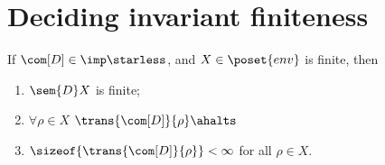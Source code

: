 \section{Deciding invariant finiteness}\label{sec:finiteness}

\begin{lemma}\label{le:finiteness}
  If \(\com[D]\in\imp\starless\), and \(X \in \poset{env}\) is
  finite, then
  \begin{enumerate}[label=(\roman*).]
  \item \(\sem{D}X\) is finite;
  \item \(\forall \rho \in X\) \(\trans{\com[D]}{\rho}\ahalts\)
  \item \(\sizeof{\trans{\com[D]}{\rho}} < \infty\) for all
    \(\rho \in X\).
  \end{enumerate}
\end{lemma}

